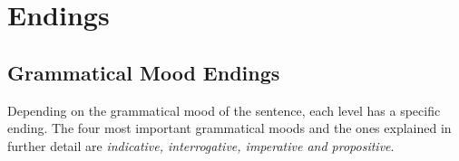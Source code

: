 \section{Endings}
\subsection{Grammatical Mood Endings}
Depending on the grammatical mood  of the sentence, each level has a specific ending. The four most important grammatical moods and the ones explained in further detail are \textit{indicative, interrogative, imperative and propositive}.




